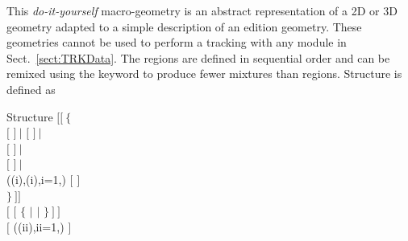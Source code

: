 This {\sl do-it-yourself} macro-geometry is an abstract representation of a 2D or 3D geometry adapted to a simple description of an edition geometry. These geometries cannot be used to perform a tracking with any module in Sect.~\ref{sect:TRKData}. The  regions are defined in sequential order and can be remixed using the  keyword to produce fewer mixtures than regions. Structure  is defined as

\begin{DataStructure}{Structure }
 $[[~\{$ \\
\hskip 0.5cm      $[$    $]~|$        $[$    $]~|$ \\
\hskip 0.5cm          $[$    $]~|$ \\
\hskip 0.5cm              $[$    $]~|$ \\
\hskip 0.5cm   ((i),(i),i=1,) $[$    $]$ \\
\hskip 1.35cm $\}~]]$ \\
$[$    $[$ $\{$  $|$  $|$  $\}~]~]$ \\
$[$  ((ii),ii=1,) $]$
\end{DataStructure}

